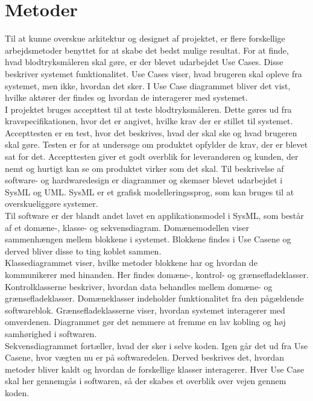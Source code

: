 \section{Metoder}
Til at kunne overskue arkitektur og designet af projektet, er flere forskellige arbejdsmetoder benyttet for at skabe det bedst mulige resultat. 
For at finde, hvad blodtryksmåleren skal gøre, er der blevet udarbejdet Use Cases. Disse beskriver systemet funktionalitet. Use Cases viser, hvad brugeren skal opleve fra systemet, men ikke, hvordan det sker. I Use Case diagrammet bliver det vist, hvilke aktører der findes og hvordan de interagerer med systemet.   \\
I projektet bruges accepttest til at teste blodtryksmåleren. Dette gøres ud fra kravspecifikationen, hvor det er angivet, hvilke krav der er stillet til systemet. \\
Accepttesten er en test, hvor det beskrives, hvad der skal ske og hvad brugeren skal gøre. Testen er for at undersøge om produktet opfylder de krav, der er blevet sat for det. Accepttesten giver et godt overblik for leverandøren og kunden, der nemt og hurtigt kan se om produktet virker som det skal. 
\newline
Til  beskrivelse af software- og hardwaredesign er diagrammer og skemaer blevet udarbejdet i SysML og UML. SysML er et grafisk modelleringssprog, som kan bruges til at overskueliggøre systemer. \\
Til software er der blandt andet lavet en applikationsmodel i SysML, som består af et domæne-, klasse- og sekvensdiagram.
Domænemodellen viser sammenhængen mellem blokkene i systemet. Blokkene findes i Use Casene og derved bliver disse to ting koblet sammen. \\
Klassediagrammet viser, hvilke metoder blokkene har og hvordan de kommunikerer med hinanden. Her findes domæne-, kontrol- og grænsefladeklasser. Kontrolklasserne beskriver, hvordan data behandles mellem domæne- og grænsefladeklasser. Domæneklasser indeholder funktionalitet fra den pågældende softwareblok. Grænsefladeklasserne viser, hvordan systemet interagerer med omverdenen. Diagrammet gør det nemmere at fremme en lav kobling og høj samhørighed i softwaren.\\
Sekvensdiagrammet fortæller, hvad der sker i selve koden. Igen går det ud fra Use Casene, hvor vægten nu er på softwaredelen. Derved beskrives det, hvordan metoder bliver kaldt og hvordan de forskellige klasser interagerer. Hver Use Case skal her gennemgås i softwaren, så der skabes et overblik over vejen gennem koden.\\
